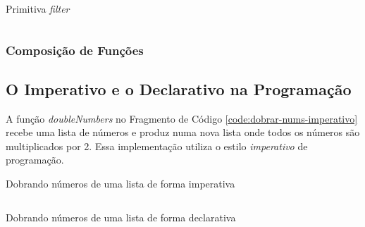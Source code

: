 \begin{listing}[H]
  \centering
  \caption{Primitiva \emph{filter}}
  \inputminted[frame=lines,
               framesep=2mm,
               baselinestretch=1.2,
               fontsize=\scriptsize, %
               linenos,
               mathescape]
               {js}{code/fp_primitives_filter.js}
  \label{code:fp_primitives_filter}
\end{listing}

\subsubsection{Composição de Funções}

%

\subsection{O Imperativo e o Declarativo na Programação}

A função \emph{doubleNumbers} no Fragmento de Código
\ref{code:dobrar-nums-imperativo} recebe uma lista de números e produz numa nova
lista onde todos os números são multiplicados por 2. Essa implementação utiliza
o estilo \emph{imperativo} de programação.

\begin{listing}[H]
  \centering
  \caption{Dobrando números de uma lista de forma imperativa}
  \inputminted[frame=lines,
               framesep=2mm,
               baselinestretch=1.2,
               fontsize=\scriptsize, %
               linenos,
               mathescape]
               {js}{code/fn_double_numbers_imperative.js}
  \label{code:fn_double_numbers_imperative}
\end{listing}

\begin{listing}[H]
  \centering
  \caption{Dobrando números de uma lista de forma declarativa}
  \inputminted[frame=lines,
               framesep=2mm,
               baselinestretch=1.2,
               fontsize=\scriptsize, %
               linenos,
               mathescape]
               {js}{code/fn_double_numbers_declarative.js}
  \label{code:fn_double_numbers_declarative}
\end{listing}

